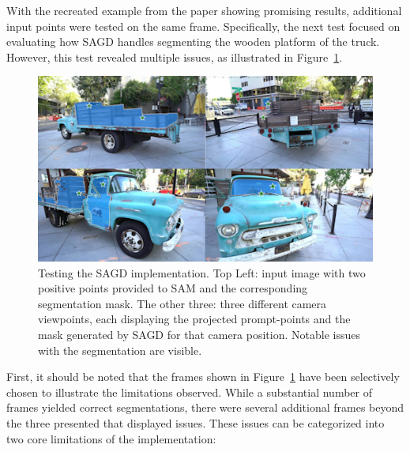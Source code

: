 \documentclass[12pt]{article}
\begin{document}
\FloatBarrier
\noindent
With the recreated example from the paper showing promising results, additional input points were tested on the same frame. Specifically, the next test focused on evaluating how SAGD handles segmenting the wooden platform of the truck. However, this test revealed multiple issues, as illustrated in Figure~\ref{fig:issues}.
\begin{figure}[h!]
	\centering
	\includegraphics[width=\textwidth]{Images/badsagd.png}
	\caption{Testing the SAGD implementation. Top Left: input image with two positive points provided to SAM and the corresponding segmentation mask. The other three: three different camera viewpoints, each displaying the projected prompt-points and the mask generated by SAGD for that camera position. Notable issues with the segmentation are visible.}
	\label{fig:issues}
\end{figure}
\FloatBarrier
\noindent
First, it should be noted that the frames shown in Figure~\ref{fig:issues} have been selectively chosen to illustrate the limitations observed. While a substantial number of frames yielded correct segmentations, there were several additional frames beyond the three presented that displayed issues. These issues can be categorized into two core limitations of the implementation:
\end{document}

